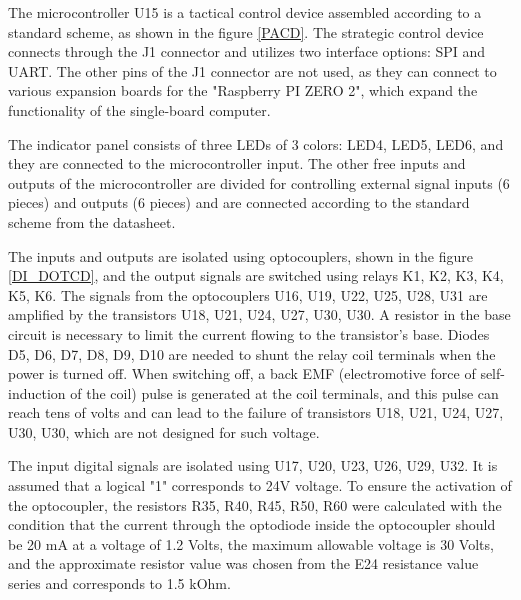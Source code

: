 The microcontroller U15 is a tactical control device assembled according to a standard scheme, as shown in the figure \ref{PACD}. The strategic control device connects through the J1 connector and utilizes two interface options: SPI and UART. The other pins of the J1 connector are not used, as they can connect to various expansion boards for the "Raspberry PI ZERO 2", which expand the functionality of the single-board computer.

The indicator panel consists of three LEDs of 3 colors: LED4, LED5, LED6, and they are connected to the microcontroller input. The other free inputs and outputs of the microcontroller are divided for controlling external signal inputs (6 pieces) and outputs (6 pieces) and are connected according to the standard scheme from the datasheet.

The inputs and outputs are isolated using optocouplers, shown in the figure \ref{DI_DOTCD}, and the output signals are switched using relays K1, K2, K3, K4, K5, K6. The signals from the optocouplers U16, U19, U22, U25, U28, U31 are amplified by the transistors U18, U21, U24, U27, U30, U30. A resistor in the base circuit is necessary to limit the current flowing to the transistor's base. Diodes D5, D6, D7, D8, D9, D10 are needed to shunt the relay coil terminals when the power is turned off. When switching off, a back EMF (electromotive force of self-induction of the coil) pulse is generated at the coil terminals, and this pulse can reach tens of volts and can lead to the failure of transistors U18, U21, U24, U27, U30, U30, which are not designed for such voltage.

The input digital signals are isolated using U17, U20, U23, U26, U29, U32. It is assumed that a logical "1" corresponds to 24V voltage. To ensure the activation of the optocoupler, the resistors R35, R40, R45, R50, R60 were calculated with the condition that the current through the optodiode inside the optocoupler should be 20 mA at a voltage of 1.2 Volts, the maximum allowable voltage is 30 Volts, and the approximate resistor value was chosen from the E24 resistance value series and corresponds to 1.5 kOhm.